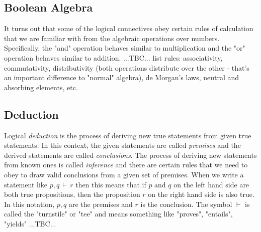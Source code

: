 \subsection{Boolean Algebra}
It turns out that some of the logical connectives obey certain rules of calculation that we are familiar with from the algebraic operations over numbers. Specifically, the "and" operation behaves similar to multiplication and the "or" operation behaves similar to addition. ...TBC... list rules: associativity, commutativity, distributivity (both operations distribute over the other - that's an important difference to "normal" algebra), de Morgan's laws, neutral and absorbing elements, etc.

%




\subsection{Deduction}
Logical \emph{deduction} is the process of deriving new true statements from given true statements. In this context, the given statements are called \emph{premises} and the derived statements are called \emph{conclusions}. The process of deriving new statements from known ones is called \emph{inference} and there are certain rules that we need to obey to draw valid conclusions from a given set of premises. When we write a statement like $p,q \,\vdash\, r$ then this means that if $p$ and $q$ on the left hand side are both true propositions, then the proposition $r$ on the right hand side is also true. In this notation, $p,q$ are the premises and $r$ is the conclusion. The symbol $\vdash$ is called the "turnstile" or "tee" and means something like "proves", "entails", "yields"  ...TBC...



